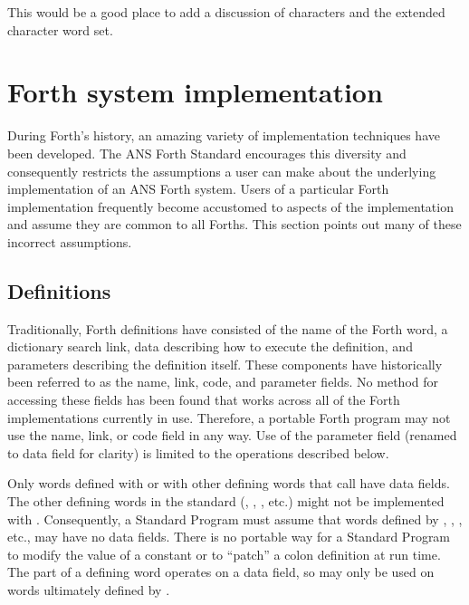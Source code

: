 \ifrelease\else
\begin{editor}
This would be a good place to add a discussion
of characters and the extended character word set.
\end{editor}
\fi

\section{Forth system implementation} %

During Forth's history, an amazing variety of implementation techniques
have been developed. The ANS Forth Standard encourages this diversity
and consequently restricts the assumptions a user can make about the
underlying implementation of an ANS Forth system. Users of a particular
Forth implementation frequently become accustomed to aspects of the
implementation and assume they are common to all Forths. This section
points out many of these incorrect assumptions.

\subsection{Definitions} %

Traditionally, Forth definitions have consisted of the name of the
Forth word, a dictionary search link, data describing how to execute
the definition, and parameters describing the definition itself. These
components have historically been referred to as the name, link, code,
and parameter fields.
No method for accessing these fields has been found that works
across all of the Forth implementations currently in use. Therefore,
a portable Forth program may not use the name, link, or code field
in any way. Use of the parameter field (renamed to data field for
clarity) is limited to the operations described below.

Only words defined with  or with other defining words
that call  have data fields. The other defining words
in the standard (, , \word{:}, etc.)
might not be implemented with . Consequently, a Standard
Program must assume that words defined by ,
, \word{:}, etc., may have no data fields. There is no
portable way for a Standard Program to modify the value of a constant or to
``patch'' a colon definition at run time.
The  part of a defining word operates on a data field,
so  may only be used on words ultimately defined by .

